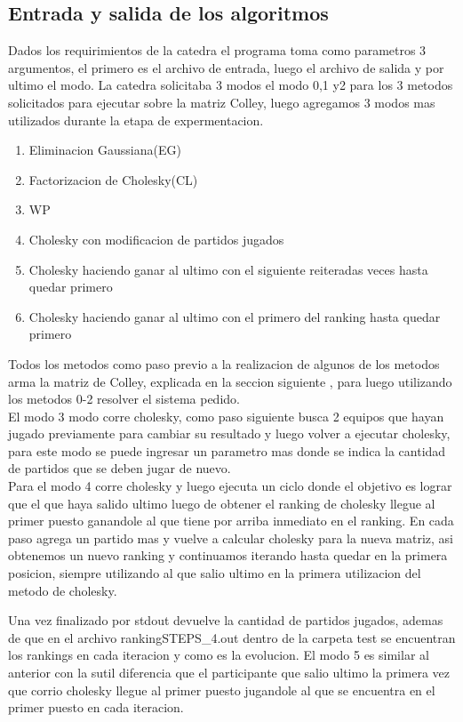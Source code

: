 \subsection{Entrada y salida de los algoritmos}

Dados los requirimientos de la catedra el programa toma como parametros 3 argumentos, el primero es el archivo de entrada, luego el archivo de salida y
por ultimo el modo.  La catedra solicitaba 3 modos el modo 0,1 y2 para los 3 metodos solicitados para ejecutar sobre la matriz Colley, luego agregamos 3 modos mas utilizados durante la etapa 
de expermentacion.
\\
\begin{enumerate}
    \item Eliminacion Gaussiana(EG)
    \item Factorizacion de Cholesky(CL)
    \item WP
    \item Cholesky con modificacion de partidos jugados
    \item Cholesky haciendo ganar al ultimo con el siguiente reiteradas veces hasta quedar primero
    \item Cholesky haciendo ganar al ultimo con el primero del ranking hasta quedar primero
\end{enumerate}
Todos los metodos como paso previo a la realizacion de algunos de los metodos arma la matriz de Colley, explicada en la seccion siguiente , para luego utilizando los metodos 0-2 resolver el sistema pedido.
\\
El modo 3 modo corre cholesky, como paso siguiente busca 2 equipos que hayan jugado previamente para cambiar su resultado y luego volver a ejecutar cholesky,
para este modo se puede ingresar un parametro mas donde se indica la cantidad de partidos que se deben jugar de nuevo.
\\
Para el modo 4 corre cholesky y luego ejecuta un ciclo donde el objetivo es lograr que el que haya salido ultimo luego de obtener el ranking de cholesky llegue al primer puesto ganandole
al que tiene por arriba inmediato en el ranking. En cada paso agrega un partido mas y vuelve a calcular cholesky para la nueva matriz, asi obtenemos un nuevo ranking y continuamos iterando hasta quedar en la primera posicion,
siempre utilizando al que salio ultimo en la primera utilizacion del metodo de cholesky.

Una vez finalizado por stdout devuelve la cantidad de partidos jugados, ademas de que en el archivo  rankingSTEPS\_4.out dentro de la carpeta test se encuentran los rankings en cada iteracion y como es la evolucion.
El modo 5 es similar al anterior con la sutil diferencia que el participante que salio ultimo la primera vez que corrio cholesky llegue al primer puesto jugandole al que se encuentra en el primer puesto en cada iteracion.

